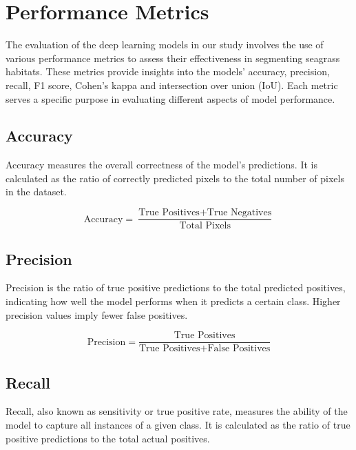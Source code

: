 \section{Performance Metrics}\label{app:performance_metrics}

The evaluation of the deep learning models in our study involves the use of
various performance metrics to assess their effectiveness in segmenting
seagrass habitats. These metrics provide insights into the models' accuracy,
precision, recall, F1 score, Cohen's kappa and intersection over union (IoU).
Each metric
serves a specific purpose in evaluating different aspects of model performance.

\subsection{Accuracy}

Accuracy measures the overall correctness of the model's predictions.
It is calculated as the ratio of correctly predicted pixels to the total number
of pixels in the dataset.

\begin{equation*}
    \text{Accuracy} = \frac{\text{True Positives} + \text{True
            Negatives}}{\text{Total Pixels}}
\end{equation*}

\subsection{Precision}

Precision is the ratio of true positive predictions to the total
predicted positives, indicating how well the model performs when it predicts a
certain class. Higher precision values imply fewer false positives.

\begin{equation*}
    \text{Precision} = \frac{\text{True Positives}}{\text{True
            Positives} + \text{False Positives}}
\end{equation*}

\subsection{Recall}

Recall, also known as sensitivity or true positive rate, measures the
ability of the model to capture all instances of a given class. It is
calculated as the ratio of true positive predictions to the total actual
positives.

